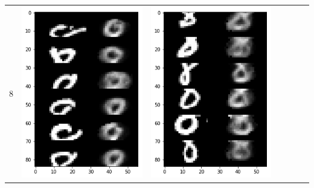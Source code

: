 \documentclass[12pt]{report} %
\begin{document}
\begin{tabular}{m{0.7cm}m{2.4cm}m{2.4cm}m{2.4cm}m{2.4cm}m{2.4cm}m{2.4cm}}
8 & \includegraphics[scale=0.3]{pictures/KE_8_up.png} & \includegraphics[scale=0.3]{pictures/KE_8_down.png} &

\end{tabular}
\end{document}

